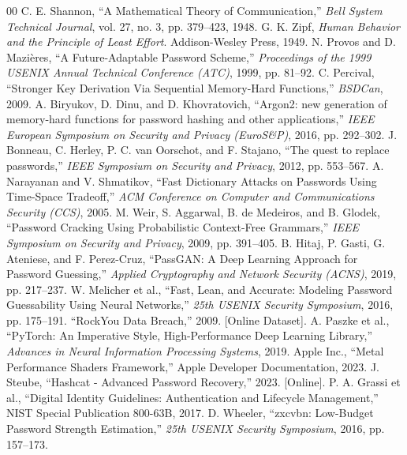 \documentclass[conference]{IEEEtran}
\begin{document}
\begin{thebibliography}{00}
 C. E. Shannon, ``A Mathematical Theory of Communication,'' \emph{Bell System Technical Journal}, vol. 27, no. 3, pp. 379--423, 1948.
 G. K. Zipf, \emph{Human Behavior and the Principle of Least Effort}. Addison-Wesley Press, 1949.
 N. Provos and D. Mazières, ``A Future-Adaptable Password Scheme,'' \emph{Proceedings of the 1999 USENIX Annual Technical Conference (ATC)}, 1999, pp. 81--92.
 C. Percival, ``Stronger Key Derivation Via Sequential Memory-Hard Functions,'' \emph{BSDCan}, 2009.
 A. Biryukov, D. Dinu, and D. Khovratovich, ``Argon2: new generation of memory-hard functions for password hashing and other applications,'' \emph{IEEE European Symposium on Security and Privacy (EuroS\&P)}, 2016, pp. 292--302.
 J. Bonneau, C. Herley, P. C. van Oorschot, and F. Stajano, ``The quest to replace passwords,'' \emph{IEEE Symposium on Security and Privacy}, 2012, pp. 553--567.
 A. Narayanan and V. Shmatikov, ``Fast Dictionary Attacks on Passwords Using Time-Space Tradeoff,'' \emph{ACM Conference on Computer and Communications Security (CCS)}, 2005.
 M. Weir, S. Aggarwal, B. de Medeiros, and B. Glodek, ``Password Cracking Using Probabilistic Context-Free Grammars,'' \emph{IEEE Symposium on Security and Privacy}, 2009, pp. 391--405.
 B. Hitaj, P. Gasti, G. Ateniese, and F. Perez-Cruz, ``PassGAN: A Deep Learning Approach for Password Guessing,'' \emph{Applied Cryptography and Network Security (ACNS)}, 2019, pp. 217--237.
 W. Melicher et al., ``Fast, Lean, and Accurate: Modeling Password Guessability Using Neural Networks,'' \emph{25th USENIX Security Symposium}, 2016, pp. 175--191.
 ``RockYou Data Breach,'' 2009. [Online Dataset].
 A. Paszke et al., ``PyTorch: An Imperative Style, High-Performance Deep Learning Library,'' \emph{Advances in Neural Information Processing Systems}, 2019.
 Apple Inc., ``Metal Performance Shaders Framework,'' Apple Developer Documentation, 2023.
 J. Steube, ``Hashcat - Advanced Password Recovery,'' 2023. [Online].
 P. A. Grassi et al., ``Digital Identity Guidelines: Authentication and Lifecycle Management,'' NIST Special Publication 800-63B, 2017.
 D. Wheeler, ``zxcvbn: Low-Budget Password Strength Estimation,'' \emph{25th USENIX Security Symposium}, 2016, pp. 157--173.
\end{thebibliography}
\end{document}
